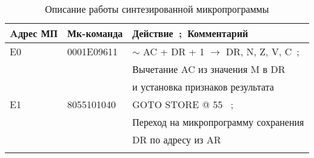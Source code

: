 \begin{longtable}{|l|l|l|}
\hline
\textbf{Aдрес МП} &	\textbf{Мк-команда}	& \textbf{Действие~;~Комментарий}   \\\hline
	E0	&	0001E09611	&	$\sim$ AC + DR + 1 $\to$ DR, N, Z, V, C~;~\\
	    &               &   Вычетание AC из значения M в DR\\
	    &               &    и установка   признаков результата\\\hline
	E1	&	8055101040	&	GOTO STORE @ 55	~;~\\
	    &               &   Переход на микропрограмму сохранения\\
	    &               &   DR по адресу из AR  \\\hline
\caption{Описание работы синтезированной микропрограммы}
\label{tab:program-desc}
\end{longtable}